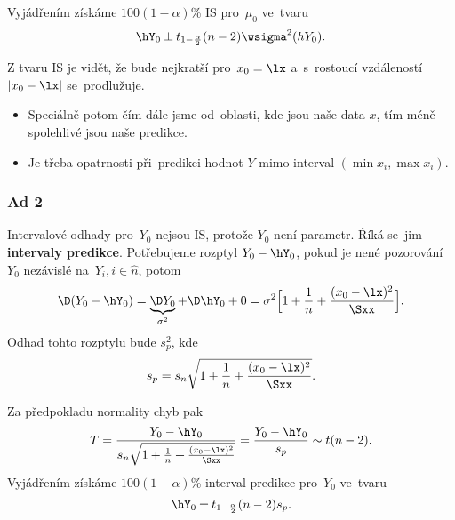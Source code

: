 	Vyjádřením získáme $100(1-\alpha)$\% IS pro~$\mu_0$ ve~tvaru $$ \hY_0\pm t_{1-\frac{\alpha}{2}}(n-2)\wsigma^2(hY_0). $$
	\begin{remark}
		Z tvaru IS je vidět, že bude nejkratší pro~$x_0=\lx$ a~s~rostoucí vzdáleností $| x_0-\lx |$ se~prodlužuje.\begin{itemize}
			\item  Speciálně potom čím dále jsme od~oblasti, kde jsou naše data $x$, tím méně spolehlivé jsou naše predikce. 
			\item Je třeba opatrnosti při~predikci hodnot $Y$ mimo interval $(\min x_i,\max x_i)$.
		\end{itemize}
\end{remark}

\subsubsection*{Ad 2}
Intervalové odhady pro~$Y_0$ nejsou IS, protože $Y_0$ není parametr. Říká se~jim \textbf{intervaly predikce}. Potřebujeme rozptyl $Y_0-\hY_0$, pokud je nené pozorování $Y_0$ nezávislé na~$Y_i,i\in\hat{n}$, potom 
$$ \D(Y_0-\hY_0)=\underbrace{\D Y_0}_{\sigma^2}+\D \hY_0+0=\sigma^2\Big[ 1+\frac{1}{n}+\frac{(x_0-\lx)^2}{\Sxx} \Big].$$ Odhad tohto rozptylu bude $s_p^2$, kde 
$$ s_p=s_n\sqrt{1+\frac{1}{n}+\frac{(x_0-\lx)^2}{\Sxx}}.$$

Za předpokladu normality chyb pak 
$$ T=\frac{Y_0-\hY_0}{s_n\sqrt{1+\frac{1}{n}+\frac{(x_0-\lx)^2}{\Sxx}}}=\frac{Y_0-\hY_0}{s_p}\sim t(n-2).$$
Vyjádřením získáme $100(1-\alpha)$\% interval predikce pro~$Y_0$ ve~tvaru 
$$ \hY_0 \pm t_{1-\frac{\alpha}{2}}(n-2)s_p.$$

